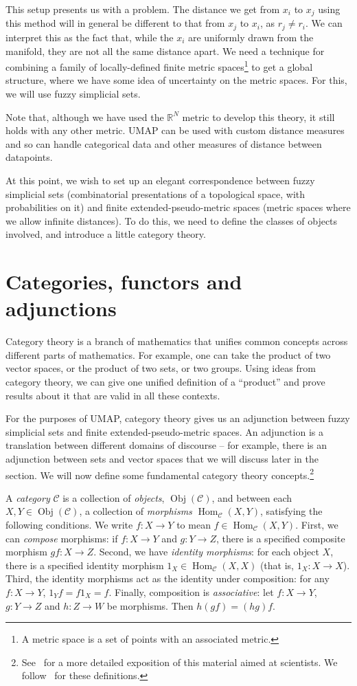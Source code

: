 \documentclass[a4paper,11pt,leqno]{article}
\newcommand{\RR}{\mathbb{R}}
\newcommand{\curC}{\mathscr{C}}
\newcommand{\Hom}{\ensuremath{\operatorname{Hom}}}
\newcommand{\Obj}{\ensuremath{\operatorname{Obj}}}
\theoremstyle{definition}
\begin{document}
This setup presents us with a problem. The distance we get from $x_i$ to $x_j$ using this method will in general be different to that from $x_j$ to $x_i$, as $r_j\not= r_i$. We can interpret this as the fact that, while the $x_i$ are uniformly drawn from the manifold, they are not all the same distance apart. We need a technique for combining a family of locally-defined finite metric spaces\footnote{
A metric space is a set of points with an associated metric.}
 to get a global structure, where we have some idea of uncertainty on the metric spaces.
 For this, we will use fuzzy simplicial sets.

Note that, although we have used the $\RR^N$ metric to develop this theory, it still holds with any other metric.
UMAP can be used with custom distance measures and so can handle categorical data and other measures of distance between datapoints.

At this point, we wish to set up an elegant correspondence between fuzzy simplicial sets (combinatorial presentations of a topological space, with probabilities on it) and finite extended-pseudo-metric spaces (metric spaces where we allow infinite distances). To do this, we need to define the classes of objects involved, and introduce a little category theory.

\section{Categories, functors and adjunctions}

Category theory is a branch of mathematics that unifies common concepts across different parts of mathematics.
For example, one can take the product of two vector spaces, or the product of two sets, or two groups.
Using ideas from category theory, we can give one unified definition of a ``product'' and prove results about it that are valid in all these contexts.

For the purposes of UMAP, category theory gives us an adjunction between fuzzy simplicial sets and finite extended-pseudo-metric spaces.
An adjunction is a translation between different domains of discourse -- for example, there is an adjunction between sets and vector spaces that we will discuss later in the section.
We will now define some fundamental category theory concepts.\footnote{
See~\cite{Spivak18} for a more detailed exposition of this material aimed at scientists.
We follow~\cite{Riehl} for these definitions.}

A \emph{category} $\curC$ is a collection of \emph{objects}, $\Obj(\curC)$, and between each $X, Y\in\Obj(\curC)$, a collection of \emph{morphisms} $\Hom_{\curC}(X, Y)$, satisfying the following conditions.
We write $f: X\to Y$ to mean $f\in \Hom_{\curC}(X, Y)$.
First, we can \emph{compose} morphisms: if $f: X\to Y$ and $g: Y\to Z$, there is a specified composite morphism $gf: X\to Z$.
Second, we have \emph{identity morphisms}: for each object $X$, there is a specified {identity} morphism $1_X \in \Hom_{\curC}(X, X)$ (that is, $1_X: X\to X$).
Third, the identity morphisms act as the identity under composition: for any $f: X\to Y$, $1_Yf = f1_X = f$.
Finally, composition is \emph{associative}: let $f: X\to Y$, $g: Y\to Z$ and $h: Z\to W$ be morphisms.
Then $h(gf) = (hg)f$.
\end{document}

